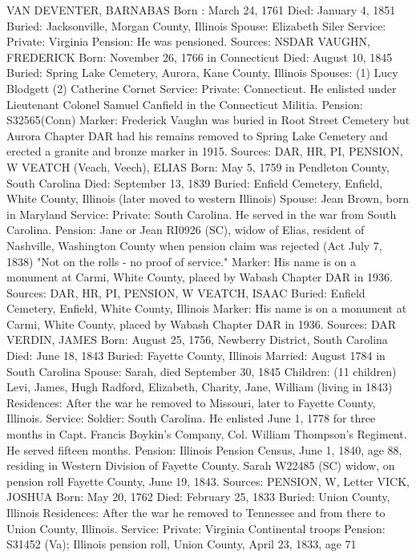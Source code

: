 VAN DEVENTER, BARNABAS 
Born : March 24, 1761 
Died: January 4, 1851 
Buried: Jacksonville, Morgan County, Illinois 
Spouse: Elizabeth Siler 
Service: Private: Virginia 
Pension: He was pensioned. 
Sources: NSDAR 
VAUGHN, FREDERICK 
Born: November 26, 1766 in Connecticut 
Died: August 10, 1845 
Buried: Spring Lake Cemetery, Aurora, Kane County, Illinois 
Spouses: (1) Lucy Blodgett 
	 (2) Catherine Cornet 
Service: Private: Connecticut. He enlisted under Lieutenant Colonel Samuel Can­field in the Connecticut Militia. 
Pension: S32565(Conn) Marker: Frederick Vaughn was buried in Root Street Cemetery but Aurora Chap­ter DAR had his remains removed to Spring Lake Cemetery and erected a granite and bronze marker in 1915. 
Sources: DAR, HR, PI, PENSION, W 
VEATCH (Veach, Veech), ELIAS 
Born: May 5, 1759 in Pendleton County, South Carolina 
Died: September 13, 1839 
Buried: Enfield Cemetery, Enfield, White County, Illinois (later moved to western Illinois) 
Spouse: Jean Brown, born in Maryland 
Service: Private: South Carolina. He served in the war from South Carolina. 
Pension: Jane or Jean RI0926 (SC), widow of Elias, resident of Nashville, Wash­ington County when pension claim was rejected (Act July 7, 1838) "Not on the rolls - no proof of service." Marker: His name is on a monument at Carmi, White County, placed by Wa­bash Chapter DAR in 1936. 
Sources: DAR, HR, PI, PENSION, W 
VEATCH, ISAAC 
Buried: Enfield Cemetery, Enfield, White County, Illinois 
Marker: His name is on a monument at Carmi, White County, placed by Wabash Chapter DAR in 1936. 
Sources: DAR 
VERDIN, JAMES 
Born: August 25, 1756, Newberry District, South Carolina 
Died: June 18, 1843 
Buried: Fayette County, Illinois 
Married: August 1784 in South Carolina 
Spouse: Sarah, died September 30, 1845 
Children: (11 children) Levi, James, Hugh Radford, Elizabeth, Charity, Jane, William (living in 1843) 
Residences: After the war he removed to Missouri, later to Fayette County, Illinois. 
Service: Soldier: South Carolina. He enlisted June 1, 1778 for three months in Capt. Francis Boykin's Company, Col. William Thompson's Regiment. He served fifteen months. 
Pension: Illinois Pension Census, June 1, 1840, age 88, residing in Western Divi­sion of Fayette County. Sarah W22485 (SC) widow, on pension roll Fayette County, June 19, 1843. 
Sources: PENSION, W, Letter 
VICK, JOSHUA 
Born: May 20, 1762 
Died: February 25, 1833 
Buried: Union County, Illinois 
Residences: After the war he removed to Tennessee and from there to Union County, Illinois. 
Service: Private: Virginia Continental troops 
Pension: S31452 (Va); Illinois pension roll, Union County, April 23, 1833, age 71 
